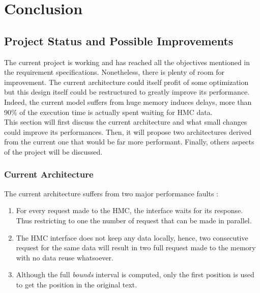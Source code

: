 
\chapter{Conclusion} %

\label{Conclusion} %

\section{Project Status and Possible Improvements}
 
The current project is working and has reached all the objectives mentioned in the requirement specifications. Nonetheless, there is plenty of room for improvement. The current architecture could itself profit of some optimization but this design itself could be restructured to greatly improve its performance. Indeed, the current model suffers from huge memory induces delays, more than 90\% of the execution time is actually spent waiting for HMC data.\\

This section will first discuss the current architecture and what small changes could improve its performances. Then, it will propose two architectures derived from the current one that would be far more performant. Finally, others aspects of the project will be discussed.

\subsection{Current Architecture}

The current architecture suffers from two major performance faults :
\begin{enumerate}
    \item For every request made to the HMC, the interface waits for its response. Thus restricting to one the number of request that can be made in parallel.
    \item The HMC interface does not keep any data locally, hence, two consecutive request for the same data will result in two full request made to the memory with no data reuse whatsoever.
    \item Although the full \textit{bounds} interval is computed, only the first position is used to get the position in the original text.
\end{enumerate}

